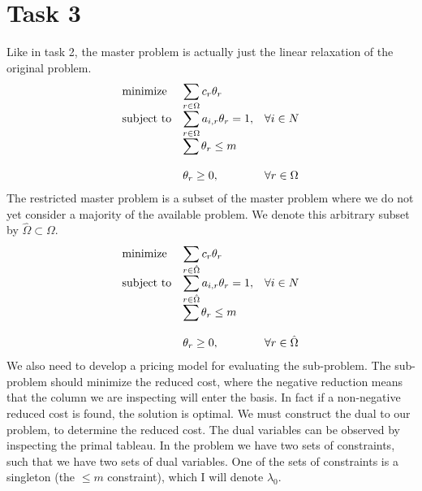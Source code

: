 \documentclass{article}
\begin{document}
    \section{Task 3}
    Like in task 2, the master problem is actually just the linear relaxation of the original problem.
    \begin{equation*}
        \begin{array}{ll@{}ll}
            \text{minimize}  & \displaystyle\sum_{r \in \Omega} c_r \theta_r& &\\
            \text{subject to}& \displaystyle\sum_{r \in \Omega} a_{i, r} \theta_r = 1 ,&   &\forall i \in N\\
            & \displaystyle\sum \theta_r \leq m &&\\\\
            & \displaystyle \theta_r  \geq 0,  && \forall r \in \Omega
        \end{array}
    \end{equation*}
    The restricted master problem is a subset of the master problem where we do not yet consider a majority of the available problem.
    We denote this arbitrary subset by $\hat{\Omega} \subset \Omega$.
    \begin{equation*}
        \begin{array}{ll@{}ll}
            \text{minimize}  & \displaystyle\sum_{r \in \hat{\Omega}} c_r \theta_r& &\\
            \text{subject to}& \displaystyle\sum_{r \in \hat{\Omega}} a_{i, r} \theta_r = 1 ,&   &\forall i \in N\\
            & \displaystyle\sum \theta_r \leq m &&\\\\
            & \displaystyle \theta_r  \geq 0,  && \forall r \in \hat{\Omega}
        \end{array}
    \end{equation*}
    We also need to develop a pricing model for evaluating the sub-problem.
    The sub-problem should minimize the reduced cost, where the negative reduction means that the column we are inspecting will enter the basis.
    In fact if a non-negative reduced cost is found, the solution is optimal.
    We must construct the dual to our problem, to determine the reduced cost.
    The dual variables can be observed by inspecting the primal tableau.
    In the problem we have two sets of constraints, such that we have two sets of dual variables.
    One of the sets of constraints is a singleton (the $\leq m$ constraint), which I will denote $\lambda_0$.
\end{document}

